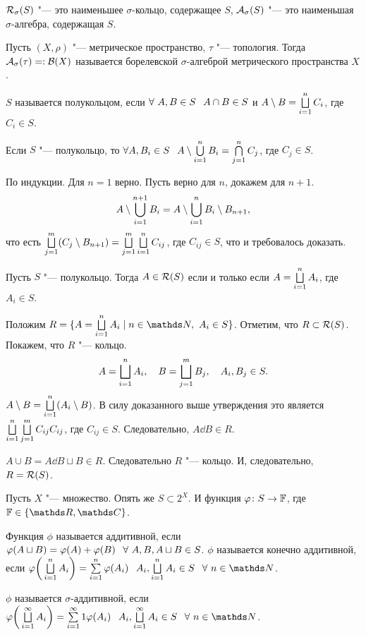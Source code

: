 $\mathcal R_\sigma(S)$ "--- это наименьшее $\sigma$-кольцо, содержащее $S$, $\mathcal A_\sigma(S)$ "--- это наименьшая $\sigma$-алгебра, содержащая $S$.
\begin{Def}
  Пусть $(X,\rho)$ "--- метрическое пространство, $\tau$ "--- топология. Тогда $\mathcal A_\sigma(\tau) =: \mathcal B(X)$ называется борелевской $\sigma$-алгеброй метрического пространства $X$.
\end{Def}

\begin{Def}
  $S$ называется полукольцом, если $\forall\ A,B\in S\pau A\cap B\in S$ и $A\setminus B = \bigsqcup\limits_{i=1}^{n} C_i$, где $C_i\in S$.
\end{Def}

\begin{Ut}
  Если $S$ "--- полукольцо, то $\forall A, B_i\in S\pau A\dd \UN i1n B_i = \CAP j1n C_j$, где $C_j\in S$.
\end{Ut}

\begin{Proof}
  По индукции. Для $n=1$ верно. Пусть верно для $n$, докажем для $n+1$.
\[
  A\setminus \bigcup\limits_{i=1}^{n+1} B_i = A\setminus \bigcup\limits_{i=1}^{n}B_i\setminus B_{n+1},
\]
что есть $\bigsqcup\limits_{j=1}^{m} (C_j\setminus B_{n+1}) = \bigsqcup\limits_{j=1}^{m}\bigsqcup\limits_{i=1}^{n} C_{ij}$, где $C_{ij}\in S$, что и требовалось доказать.
\end{Proof}

\begin{Lem}
  Пусть $S$ "--- полукольцо. Тогда $A\in \mathcal R(S)$ если и только если $A = \bigsqcup\limits_{i=1}^{n} A_i$, где $A_i\in S$.
\end{Lem}

\begin{Proof}
  Положим $R = \{ A = \DUN i1n A_i\mid n\in\N,\ A_i\in S\}$. Отметим, что $R\subset \mathcal R(S)$. Покажем, что $R$ "--- кольцо.
\[
  A = \bigsqcup\limits_{i=1}^{n} A_i,\quad B=\bigsqcup\limits_{j=1}^{m}B_j,\quad A_i,B_j\in S.
\]
$A\setminus B = \bigsqcup\limits_{i=1}^{n} (A_i\setminus B)$. В силу доказанного выше утверждения это является $\bigsqcup\limits_{i=1}^{n}\bigsqcup\limits_{j=1}^{m}C_{ij} C_{ij}$, где $C_{ij}\in S$. Следовательно, $A\dd B\in R$.

$A\cup B = A\dd B\sqcup B\in R$. Следовательно $R$ "--- кольцо. И, следовательно, $R = \mathcal R(S)$.
\end{Proof}

Пусть $X$ "--- множество. Опять же $S\subset 2^X$. И функция $\varphi\colon S\rightarrow \mathbb F$, где $\F\in\{\R,\C\}$.
\begin{Def}
 Функция $\phi$ называется аддитивной, если $\varphi (A\sqcup B) = \varphi(A)+\varphi(B)\hskip .75em plus.1em minus.08em\relax \forall\ A,B,A\sqcup B\in S$. $\phi$ называется конечно аддитивной, если $\phi \bigg(\DUN i1n A_i\bigg)  = \RY i1n\phi(A_i)\pau A_i,\DUN i1n A_i\in S\pau \forall\ n\in \N$.
\end{Def}
\begin{Def}
  $\phi$ называется $\sigma$-аддитивной, если $\phi \bigg(\duN i1 A_i\bigg)  = \rY i1\phi(A_i)\pau A_i,\duN i1 A_i\in S\pau \forall\ n\in \N$.
\end{Def}

